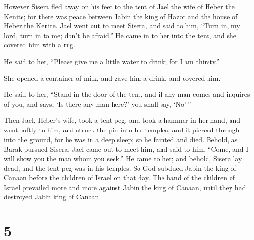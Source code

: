  However Sisera fled away on his feet to the tent of Jael
the wife of Heber the Kenite; for there was peace between Jabin the king
of Hazor and the house of Heber the Kenite.  Jael went
out to meet Sisera, and said to him, ``Turn in, my lord, turn in to me;
don't be afraid.'' He came in to her into the tent, and she covered him
with a rug.

 He said to her, ``Please give me a little water to
drink; for I am thirsty.''

She opened a container of milk, and gave him a drink, and covered him.

 He said to her, ``Stand in the door of the tent, and if
any man comes and inquires of you, and says, `Is there any man here?'
you shall say, `No.'\,''

 Then Jael, Heber's wife, took a tent peg, and took a
hammer in her hand, and went softly to him, and struck the pin into his
temples, and it pierced through into the ground, for he was in a deep
sleep; so he fainted and died.  Behold, as Barak pursued
Sisera, Jael came out to meet him, and said to him, ``Come, and I will
show you the man whom you seek.'' He came to her; and behold, Sisera lay
dead, and the tent peg was in his temples.  So God
subdued Jabin the king of Canaan before the children of Israel on that
day.  The hand of the children of Israel prevailed more
and more against Jabin the king of Canaan, until they had destroyed
Jabin king of Canaan.

\hypertarget{section-4}{%
\section{5}\label{section-4}}


